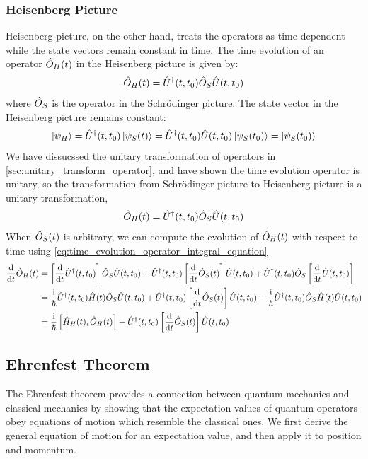\subsubsection{Heisenberg Picture}
Heisenberg picture, on the other hand, treats the operators as time-dependent while the state vectors remain constant in time. The time evolution of an operator $\hat{O}_H(t)$ in the Heisenberg picture is given by:
\begin{align}
    \hat{O}_H(t) = \hat{U}^\dag(t,t_0) \hat{O}_S \hat{U}(t,t_0)
\end{align}
where $\hat{O}_S$ is the operator in the Schrödinger picture. The state vector in the Heisenberg picture remains constant:
\begin{align}
    \ket{\psi_H} = \hat{U}^ \dag (t,t_0) \ket{\psi_S(t)} = \hat{U}^ \dag (t,t_0) \hat{U}(t,t_0) \ket{\psi_S(t_0)} = \ket{\psi_S(t_0)}
\end{align}
We have dissucssed the unitary transformation of operators in \cref{sec:unitary_transform_operator}, and have shown the time evolution operator is unitary, so the transformation from Schrödinger picture to Heisenberg picture is a unitary transformation, 
\begin{align}
    \hat{O}_H(t) = \hat{U}^\dag(t,t_0) \hat{O}_S \hat{U}(t,t_0)
\end{align}
When $\hat{O}_S(t)$ is arbitrary, we can compute the evolution of $\hat{O}_H(t)$ with respect to time using \cref{eq:time_evolution_operator_integral_equation}
\begin{align}
    \frac{\mathrm{d}}{\mathrm{d} t} \hat{O}_H(t) &= \left[\frac{\mathrm{d}}{\mathrm{d} t} \hat{U}^\dag(t,t_0)\right] \hat{O}_S \hat{U}(t,t_0) + \hat{U}^ \dag (t,t_0) \left[\frac{\mathrm{d}}{\mathrm{d} t} \hat{O}_S(t)\right] \hat{U} (t,t_0) + \hat{U}^\dag(t,t_0) \hat{O}_S \left[\frac{\mathrm{d}}{\mathrm{d} t} \hat{U}(t,t_0)\right] \notag \\
    &= \frac{\mathrm{i}}{\hbar} \hat{U}^\dag(t,t_0) \hat{H}(t) \hat{O}_S \hat{U}(t,t_0) + \hat{U}^\dag(t,t_0) \left[\frac{\mathrm{d}}{\mathrm{d} t} \hat{O}_S(t)\right] \hat{U} (t,t_0) - \frac{\mathrm{i}}{\hbar} \hat{U}^\dag(t,t_0) \hat{O}_S \hat{H}(t) \hat{U}(t,t_0) \notag \\
    &= \frac{\mathrm{i}}{\hbar} \left[\hat{H}_H(t), \hat{O}_H(t)\right] + \hat{U}^\dag(t,t_0) \left[\frac{\mathrm{d}}{\mathrm{d} t} \hat{O}_S(t)\right] \hat{U} (t,t_0) \label{eq:heisenberg_equation_of_motion}
\end{align}

\subsection{Ehrenfest Theorem}
The Ehrenfest theorem provides a connection between quantum mechanics and classical mechanics by showing that the expectation values of quantum operators obey equations of motion which resemble the classical ones. We first derive the general equation of motion for an expectation value, and then apply it to position and momentum.

